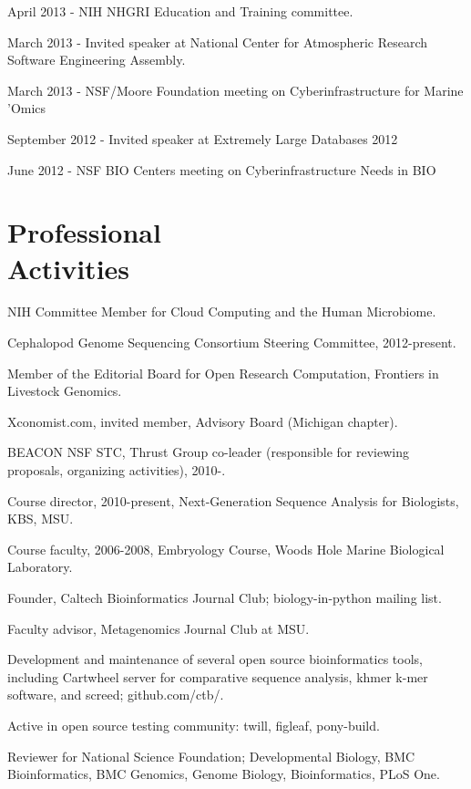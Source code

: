 \documentclass[margin,line]{resume}
\begin{document}
\begin{resume}
\begin{list1}
\item[] April 2013 - NIH NHGRI Education and Training committee.
\item[] March 2013 - Invited speaker at National Center for Atmospheric Research Software Engineering Assembly.
\item[] March 2013 - NSF/Moore Foundation meeting on Cyberinfrastructure for Marine 'Omics 
\item[] September 2012 - Invited speaker at Extremely Large Databases 2012
\item[] June 2012 - NSF BIO Centers meeting on Cyberinfrastructure Needs in BIO

\end{list1}

    \section{\mysidestyle Professional\\Activities}

\begin{list1}
\item[] NIH Committee Member for Cloud Computing and the Human Microbiome.
\item[] Cephalopod Genome Sequencing Consortium Steering Committee, 2012-present.
\item[] Member of the Editorial Board for Open Research Computation,
Frontiers in Livestock Genomics.
\item[] Xconomist.com, invited member, Advisory Board (Michigan chapter).
\item[] BEACON NSF STC, Thrust Group co-leader (responsible for reviewing
proposals, organizing activities), 2010-.
\item[] Course director, 2010-present, Next-Generation Sequence Analysis for Biologists, KBS, MSU.
\item[] Course faculty, 2006-2008, Embryology Course, Woods Hole Marine Biological Laboratory.
\item[] Founder, Caltech Bioinformatics Journal Club; biology-in-python
mailing list.
\item[] Faculty advisor, Metagenomics Journal Club at MSU.
\item[] Development and maintenance of several open source bioinformatics tools, including
Cartwheel server for comparative sequence analysis, khmer k-mer software,
and screed; github.com/ctb/.
\item[] Active in open source testing community: twill, figleaf, pony-build.
\item[] Reviewer for National Science Foundation; Developmental Biology, BMC Bioinformatics, BMC Genomics, Genome Biology, Bioinformatics, PLoS One.
\end{list1}


\end{resume}
\end{document}
